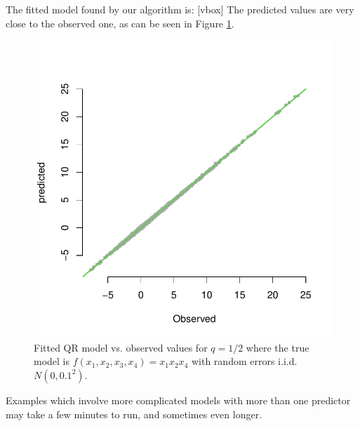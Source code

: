 \documentclass[a4paper,12pt]{article}
\begin{document}
The fitted model found by our algorithm is: [vbox]
\noindent The predicted values are very close to the observed one, as can be  seen in Figure \ref{multivariate04}.

\begin{figure}[b!]
\centering
\includegraphics[width=.5\linewidth]{Figures/multivariate04.pdf}
\caption{Fitted QR model vs. observed values for $q=1/2$ where the true model is $f(x_1, x_2, x_3, x_4)=x_1x_2x_4$ with random errors i.i.d. $N(0, 0.1^2)$.}\label{multivariate04}
\end{figure} 

\bigskip
Examples which involve more complicated models with more than one predictor may take a few minutes to run, and sometimes even longer. 

% 
% 
% 
% 
\end{document}
